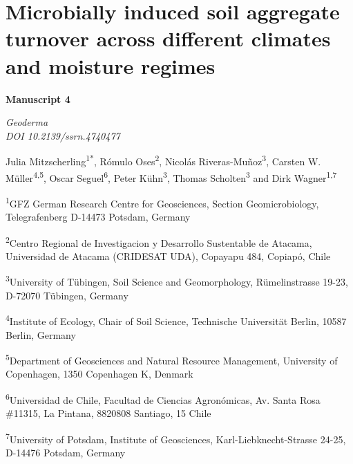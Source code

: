 \chapter{Microbially induced soil aggregate turnover across different climates and moisture regimes}
\label{chap:manuscript4} %

\begin{center}
    \textbf{\Large Manuscript 4}
  
    \vspace{0.3cm}
    \textit{Geoderma}\\
    \textit{DOI 10.2139/ssrn.4740477}
    
    \vspace{0.5cm}

    Julia Mitzscherling\textsuperscript{1*}, Rómulo Oses\textsuperscript{2}, Nicolás Riveras-Muñoz\textsuperscript{3}, Carsten W. Müller\textsuperscript{4,5}, Oscar Seguel\textsuperscript{6},   Peter Kühn\textsuperscript{3}, Thomas Scholten\textsuperscript{3} and Dirk Wagner\textsuperscript{1,7}

    \vspace{0.2cm}
  \end{center}
  
  \begin{small}
    \begin{justify}
        
        \textsuperscript{1}GFZ German Research Centre for Geosciences, Section Geomicrobiology, Telegrafenberg D-14473 Potsdam, Germany

        \textsuperscript{2}Centro Regional de Investigacion y Desarrollo Sustentable de Atacama, Universidad de Atacama (CRIDESAT UDA), Copayapu 484, Copiapó, Chile

        \textsuperscript{3}University of Tübingen, Soil Science and Geomorphology, Rümelinstrasse 19-23, D-72070 Tübingen, Germany

        \textsuperscript{4}Institute of Ecology, Chair of Soil Science, Technische Universität Berlin, 10587 Berlin, Germany

        \textsuperscript{5}Department of Geosciences and Natural Resource Management, University of Copenhagen, 1350 Copenhagen K, Denmark

        \textsuperscript{6}Universidad de Chile, Facultad de Ciencias Agronómicas, Av. Santa Rosa \#11315, La Pintana, 8820808 Santiago, 15 Chile

        \textsuperscript{7}University of Potsdam, Institute of Geosciences, Karl-Liebknecht-Strasse 24-25, D-14476 Potsdam, Germany

    \end{justify}
  \end{small}
    
